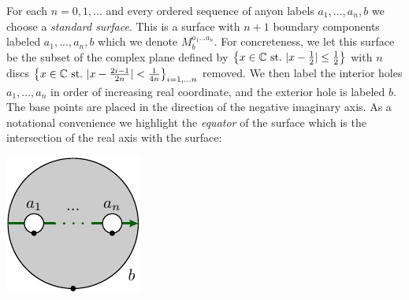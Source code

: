 \documentclass[aps, prl, letterpaper, twocolumn, superscriptaddress, notitlepage, 10pt]{revtex4-1}
\begin{document}
\newcommand{\StdM}{M^{a_1...a_n}_{b}}

For each $n=0,1,...$ and every ordered sequence of
anyon labels $a_1,...,a_n,b$ we choose a \emph{standard surface}.
This is a surface with
$n+1$ boundary components labeled $a_1,...,a_n,{b}$ 
which we denote $\StdM.$ 
For concreteness, we 
let this surface be the subset of
the complex plane defined by
$\bigl\{x\in\C \ \mathrm{st.}\  |x-\frac{1}{2}|\le \frac{1}{2}\bigr\}$
with $n$ discs
$\bigl\{x\in\C \ \mathrm{st.}\  |x-\frac{2i-1}{2n}|< \frac{1}{4n}\bigr\}_{i=1,...n}$
removed.
We then label the interior holes $a_1,...,a_n$ in order of
increasing real coordinate, and the exterior hole is labeled ${b}$.
The base points are placed in the direction of the negative imaginary axis.
As a notational convenience we highlight the \emph{equator}
of the surface %
which is the intersection of
the real axis with the surface:
\begin{center}
\includegraphics[]{pic-disc-standard.pdf}
\end{center}
\end{document}

